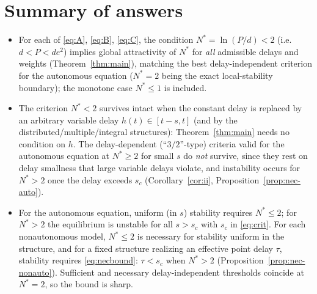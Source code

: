 \documentclass[12pt]{article}
\theoremstyle{definition}
\begin{document}
\section{Summary of answers}

\begin{itemize}
\item[\textbf{(i)}] For each of \eqref{eq:A}, \eqref{eq:B}, \eqref{eq:C}, the
condition $N^*=\ln(P/d)<2$ (i.e. $d<P<de^2$) implies global attractivity of
$N^*$ for \emph{all} admissible delays and weights (Theorem~\ref{thm:main}),
matching the best delay-independent criterion for the autonomous equation
($N^*=2$ being the exact local-stability boundary); the monotone case
$N^*\le1$ is included.

\item[\textbf{(ii)}] The criterion $N^*<2$ survives intact when the constant
delay is replaced by an arbitrary variable delay $h(t)\in[t-s,t]$ (and by the
distributed/multiple/integral structures): Theorem~\ref{thm:main} needs no
condition on $h$. The delay-dependent (``$3/2$''-type) criteria valid for the
autonomous equation at $N^*\ge2$ for small $s$ do \emph{not} survive, since they
rest on delay smallness that large variable delays violate, and instability
occurs for $N^*>2$ once the delay exceeds $s_c$ (Corollary~\ref{cor:ii},
Proposition~\ref{prop:nec-auto}).

\item[\textbf{(iii)}] For the autonomous equation, uniform (in $s$) stability
requires $N^*\le2$; for $N^*>2$ the equilibrium is unstable for all $s>s_c$ with
$s_c$ in \eqref{eq:crit}. For each nonautonomous model, $N^*\le2$ is necessary
for stability uniform in the structure, and for a fixed structure realizing an
effective point delay $\tau$, stability requires \eqref{eq:necbound}: $\tau<s_c$
when $N^*>2$ (Proposition~\ref{prop:nec-nonauto}). Sufficient and necessary
delay-independent thresholds coincide at $N^*=2$, so the bound is sharp.
\end{itemize}
\end{document}
